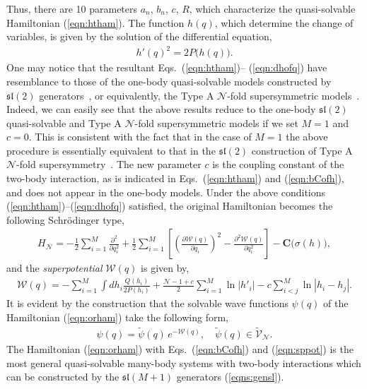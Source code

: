 \documentclass[a4paper,preprint,amsfonts,amssymb,amsmath,%
tightenlines,nofootinbib,noshowpacs]{revtex4}
\newcommand{\cN}{\mathcal{N}}
\newcommand{\cV}{\mathcal{V}}
\newcommand{\cW}{\mathcal{W}}
\newcommand{\bC}{\boldsymbol{C}}
\newcommand{\Lsl}{\mathfrak{sl}}
\newcommand{\Int}{\int\!\!}
\begin{document}
Thus, there are 10 parameters $a_{n}$, $b_{n}$, $c$, $R$, which
characterize the quasi-solvable Hamiltonian (\ref{eqn:htham}).
The function $h(q)$, which determine the change of variables,
is given by the solution of the differential equation,
\begin{eqnarray}
h'(q)^{2}=2P\bigl(h(q)\bigr).
\label{eqn:dhofq}
\end{eqnarray}
One may notice that the resultant Eqs.~(\ref{eqn:htham})--%
(\ref{eqn:dhofq}) have resemblance to those of the one-body
quasi-solvable models constructed by $\Lsl (2)$
generators~\cite{Turbi1,LoKaOl3,LoKaOl4}, or equivalently, the
Type A $\cN$-fold supersymmetric models~\cite{ANST1,ANST2}. Indeed,
we can easily see that the above results reduce to the one-body
$\Lsl (2)$ quasi-solvable and Type A $\cN$-fold supersymmetric
models if we set $M=1$ and $c=0$. This is consistent with the fact
that in the case of $M=1$ the above procedure is essentially
equivalent to that in the $\Lsl (2)$ construction of Type A
$\cN$-fold supersymmetry~\cite{ANST1}. The new parameter $c$ is
the coupling constant of the two-body interaction, as is indicated
in Eqs.~(\ref{eqn:htham}) and (\ref{eqn:bCofh}), and does not
appear in the one-body models. Under the above conditions
(\ref{eqn:htham})--(\ref{eqn:dhofq}) satisfied, the original
Hamiltonian becomes the following Schr\"{o}dinger type,
\begin{eqnarray}
H_{\cN}=-\frac{1}{2}\sum_{i=1}^{M}\frac{\partial^{2}}%
{\partial q_{i}^{2}}+\frac{1}{2}\sum_{i=1}^{M}\left[\left(
\frac{\partial\cW(q)}{\partial q_{i}}\right)^{2}
-\frac{\partial^{2}\cW(q)}{\partial q_{i}^{2}}\right]
-\bC\bigl(\sigma(h)\bigr),
\label{eqn:orham}
\end{eqnarray}
and the \textit{superpotential} $\cW(q)$ is given by,
\begin{eqnarray}
\cW(q)=-\sum_{i=1}^{M}\Int dh_{i}\frac{Q(h_{i})}{2P(h_{i})}
+\frac{\cN -1+c}{2}\sum_{i=1}^{M}\ln\left| h'_{i}\right|
-c\sum_{i<j}^{M}\ln\left| h_{i}-h_{j}\right|.
\label{eqn:sppot}
\end{eqnarray}
It is evident by the construction that the solvable wave functions
$\psi(q)$ of the Hamiltonian (\ref{eqn:orham}) take the following form,
\begin{eqnarray}
\psi(q)=\tilde{\psi}(q)\, e^{-\cW(q)},\quad \tilde{\psi}(q)
\in\tilde{\cV}_{\cN}.
\label{eqn:svwav}
\end{eqnarray}
The Hamiltonian (\ref{eqn:orham}) with Eqs.~(\ref{eqn:bCofh}) and
(\ref{eqn:sppot}) is the most general quasi-solvable many-body
systems with two-body interactions which can be constructed by
the $\Lsl (M+1)$ generators (\ref{eqns:gensl}).
\end{document}
